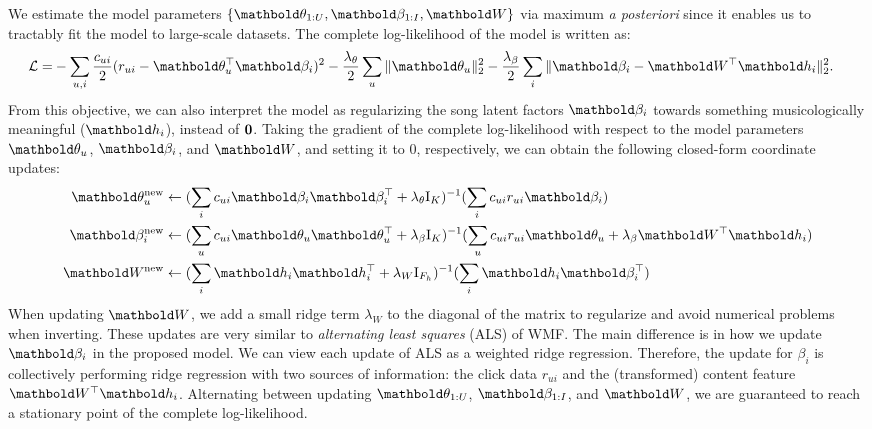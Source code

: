 We estimate the model parameters $\{\mb\theta_{1:U}, \mb\beta_{1:I}, \mbW\}$ via maximum \emph{a posteriori} since it enables us to tractably fit the model to large-scale datasets. The complete log-likelihood of the model is written as:
\begin{equation*}
\begin{split}
\mathcal{L} =& -\sum_{u, i} \frac{c_{ui}}{2} (r_{ui} - \mb\theta_u^\top\mb\beta_i)^2 - \frac{\lambda_\theta}{2} \sum_u \| \mb\theta_u \|_2^2 - \frac{\lambda_\beta}{2} \sum_i \|\mb\beta_i - \mbW^\top\mb{h}_i \|^2_2.
\end{split}
\end{equation*}
From this objective, we can also interpret the model as regularizing the song latent factors $\mb\beta_i$ towards something musicologically meaningful ($\mbh_i$), instead of $\boldsymbol{0}$.
Taking the gradient of the complete log-likelihood with respect to the model parameters $\mb\theta_u$, $\mb\beta_i$, and $\mbW$, and setting it to 0, respectively, we can obtain the following closed-form coordinate updates:
\begin{align}
\mb\theta_u^\new &\leftarrow (\sum_i c_{ui}\mb\beta_i\mb\beta_i^\top + \lambda_\theta \mathrm{I}_K)^{-1} (\sum_i c_{ui} r_{ui} \mb\beta_i) \label{chpt:conent:eq:update_user}\\
\mb\beta_i^\new &\leftarrow (\sum_u c_{ui} \mb\theta_u \mb\theta_u^\top + \lambda_\beta \mathrm{I}_K)^{-1} (\sum_u c_{ui} r_{ui} \mb\theta_u + \lambda_\beta \mbW^\top \mb{h}_i) \label{chpt:content:eq:update_item}\\
\mbW^\new &\leftarrow (\sum_i \mbh_i\mbh_i^\top + \lambda_W \mathrm{I}_{F_h})^{-1} (\sum_i \mbh_i \mb\beta_i^\top)\label{chpt:content:eq:update_weights}
\end{align}
When updating $\mbW$, we add a small ridge term $\lambda_W$ to the diagonal of the matrix to regularize and avoid numerical problems when inverting. These updates are very similar to \textit{alternating least squares} (ALS) of \gls{WMF}. The main difference is in how we update $\mb\beta_i$ in the proposed model. We can view each update of ALS as a weighted ridge regression. Therefore, the update for $\beta_i$ is collectively performing ridge regression with two sources of information: the click data $r_{ui}$ and the (transformed) content feature $\mbW^\top\mbh_i$.
Alternating between updating $\mb\theta_{1:U}$, $\mb\beta_{1:I}$, and $\mbW$, we are guaranteed to reach a stationary point of the complete log-likelihood. 

